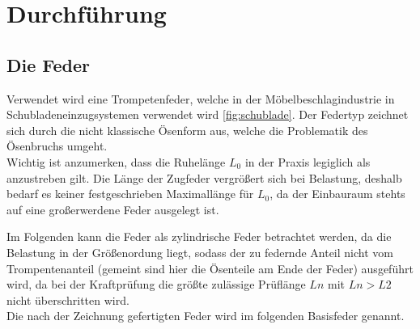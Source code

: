 \newpage
\section{Durchführung}
\label{sec:Durchfuehrung}

\subsection{Die Feder}
\label{sec:feder}
Verwendet wird eine Trompetenfeder, welche in der Möbelbeschlagindustrie in Schubladeneinzugsystemen
verwendet wird \ref{fig:schublade}. 
Der Federtyp zeichnet sich durch die nicht klassische Ösenform aus, welche die Problematik des Ösenbruchs umgeht.\\

Wichtig ist anzumerken, dass die Ruhelänge $L_0$ in der Praxis legiglich als anzustreben gilt.
Die Länge der Zugfeder vergrößert sich bei Belastung, deshalb bedarf es keiner festgeschrieben Maximallänge für $L_0$, da
der Einbauraum stehts auf eine großerwerdene Feder ausgelegt ist.  

\begin{center}
\end{center}
Im Folgenden kann die Feder als zylindrische Feder betrachtet werden,
da die Belastung in der Größenordung liegt, sodass der zu federnde Anteil nicht 
vom Trompentenanteil (gemeint sind hier die Ösenteile am Ende der Feder)
ausgeführt wird, da bei der Kraftprüfung die größte zulässige Prüflänge $Ln$ mit 
$Ln>L2$ nicht überschritten wird.\\
Die nach der Zeichnung gefertigten Feder wird im folgenden Basisfeder genannt.

